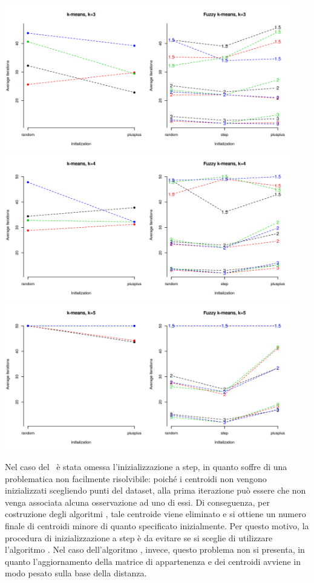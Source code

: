 \documentclass[runningheads]{llncs}
\begin{document}
\begin{center}
    \includegraphics[width=0.94\textwidth]{figures/clust-3.png}
    \includegraphics[width=0.94\textwidth]{figures/clust-4.png}
    \includegraphics[width=0.94\textwidth]{figures/clust-5.png}
    \label{fig:results}
\end{center}

Nel caso del \km\ è stata omessa l'inizializzazione a step, in quanto soffre di una problematica non facilmente risolvibile: poiché i centroidi non vengono inizializzati scegliendo punti del dataset, alla prima iterazione può essere che non venga associata alcuna osservazione ad uno di essi. Di conseguenza, per costruzione degli algoritmi \mr, tale centroide viene eliminato e si ottiene un numero finale di centroidi minore di quanto specificato inizialmente. Per questo motivo, la procedura di inizializzazione a step è da evitare se si sceglie di utilizzare l'algoritmo \km. Nel caso dell'algoritmo \fcm, invece, questo problema non si presenta, in quanto l'aggiornamento della matrice di appartenenza e dei centroidi avviene in modo pesato sulla base della distanza.\\
\end{document}

